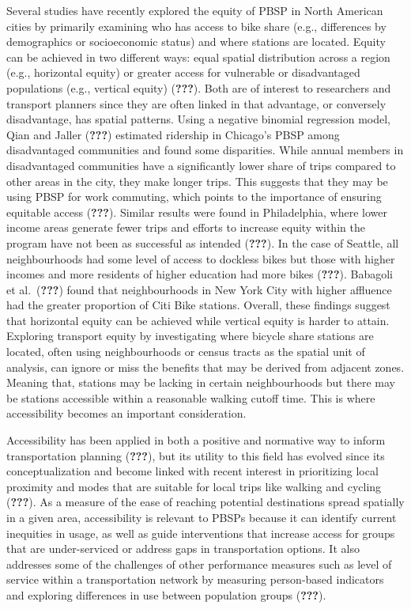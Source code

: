 \documentclass[]{elsarticle} %
\begin{document}
Several studies have recently explored the equity of PBSP in North
American cities by primarily examining who has access to bike share
(e.g., differences by demographics or socioeconomic status) and where
stations are located. Equity can be achieved in two different ways:
equal spatial distribution across a region (e.g., horizontal equity) or
greater access for vulnerable or disadvantaged populations (e.g.,
vertical equity) ({\textbf{???}}). Both are of interest to researchers
and transport planners since they are often linked in that advantage, or
conversely disadvantage, has spatial patterns. Using a negative binomial
regression model, Qian and Jaller ({\textbf{???}}) estimated ridership
in Chicago's PBSP among disadvantaged communities and found some
disparities. While annual members in disadvantaged communities have a
significantly lower share of trips compared to other areas in the city,
they make longer trips. This suggests that they may be using PBSP for
work commuting, which points to the importance of ensuring equitable
access ({\textbf{???}}). Similar results were found in Philadelphia,
where lower income areas generate fewer trips and efforts to increase
equity within the program have not been as successful as intended
({\textbf{???}}). In the case of Seattle, all neighbourhoods had some
level of access to dockless bikes but those with higher incomes and more
residents of higher education had more bikes ({\textbf{???}}). Babagoli
et al.~({\textbf{???}}) found that neighbourhoods in New York City with
higher affluence had the greater proportion of Citi Bike stations.
Overall, these findings suggest that horizontal equity can be achieved
while vertical equity is harder to attain. Exploring transport equity by
investigating where bicycle share stations are located, often using
neighbourhoods or census tracts as the spatial unit of analysis, can
ignore or miss the benefits that may be derived from adjacent zones.
Meaning that, stations may be lacking in certain neighbourhoods but
there may be stations accessible within a reasonable walking cutoff
time. This is where accessibility becomes an important consideration.

Accessibility has been applied in both a positive and normative way to
inform transportation planning ({\textbf{???}}), but its utility to this
field has evolved since its conceptualization and become linked with
recent interest in prioritizing local proximity and modes that are
suitable for local trips like walking and cycling ({\textbf{???}}). As a
measure of the ease of reaching potential destinations spread spatially
in a given area, accessibility is relevant to PBSPs because it can
identify current inequities in usage, as well as guide interventions
that increase access for groups that are under-serviced or address gaps
in transportation options. It also addresses some of the challenges of
other performance measures such as level of service within a
transportation network by measuring person-based indicators and
exploring differences in use between population groups ({\textbf{???}}).
\end{document}
